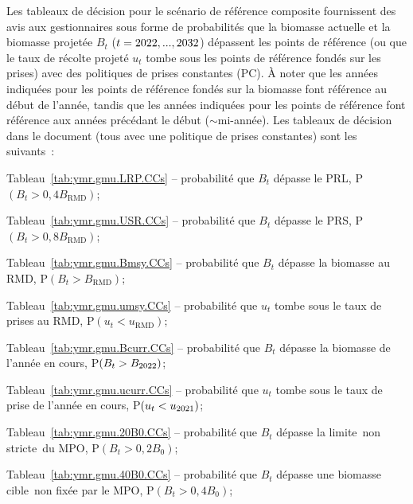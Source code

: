 \documentclass[11pt]{book}
\newcommand{\Bmsy}{B_\text{RMD}}
\newcommand{\umsy}{u_\text{RMD}}
\newcommand{\angL}{\guillemotleft\,}
\newcommand{\angR}{\,\guillemotright}
\begin{document}
Les tableaux de d\'{e}cision pour le sc\'{e}nario de r\'{e}f\'{e}rence composite fournissent des avis aux gestionnaires sous forme de probabilit\'{e}s que la biomasse actuelle et la biomasse projet\'{e}e $B_t$ ($t = 2022, ..., 2032$) d\'{e}passent les points de r\'{e}f\'{e}rence (ou que le taux de r\'{e}colte projet\'{e} $u_t$ tombe sous les points de r\'{e}f\'{e}rence fond\'{e}s sur les prises) avec des politiques de prises constantes (PC). \`{A} noter que les ann\'{e}es indiqu\'{e}es pour les points de r\'{e}f\'{e}rence fond\'{e}s sur la biomasse font r\'{e}f\'{e}rence au d\'{e}but de l'ann\'{e}e, tandis que les ann\'{e}es indiqu\'{e}es pour les points de r\'{e}f\'{e}rence font r\'{e}f\'{e}rence aux ann\'{e}es pr\'{e}c\'{e}dant le d\'{e}but ($\sim$mi-ann\'{e}e).
Les tableaux de d\'{e}cision dans le document (tous avec une politique de prises constantes) sont les suivants~:
\begin{itemize_csas}{}{}
\item Tableau~\ref{tab:ymr.gmu.LRP.CCs} -- probabilit\'{e} que $B_t$ d\'{e}passe le PRL, P$(B_t > 0,4 \Bmsy)$; %
\item Tableau~\ref{tab:ymr.gmu.USR.CCs} -- probabilit\'{e} que $B_t$ d\'{e}passe le PRS, P$(B_t > 0,8 \Bmsy)$; %
\item Tableau~\ref{tab:ymr.gmu.Bmsy.CCs} -- probabilit\'{e} que $B_t$ d\'{e}passe la biomasse au RMD, P$(B_t > \Bmsy)$; %
\item Tableau~\ref{tab:ymr.gmu.umsy.CCs} -- probabilit\'{e} que $u_t$ tombe sous le taux de prises au RMD, P$(u_t < \umsy)$; %
\item Tableau~\ref{tab:ymr.gmu.Bcurr.CCs} -- probabilit\'{e} que $B_t$ d\'{e}passe la biomasse de l'ann\'{e}e en cours, P$(B_t > B_{2022})$; %
\item Tableau~\ref{tab:ymr.gmu.ucurr.CCs} -- probabilit\'{e} que $u_t$ tombe sous le taux de prise de l'ann\'{e}e en cours, P$(u_t < u_{2021})$; %
\item Tableau~\ref{tab:ymr.gmu.20B0.CCs} -- probabilit\'{e} que $B_t$ d\'{e}passe  la limite \angL{}non stricte\angR{} du MPO, P$(B_t > 0,2 B_0)$; %
\item Tableau~\ref{tab:ymr.gmu.40B0.CCs} -- probabilit\'{e} que $B_t$ d\'{e}passe une biomasse \angL{}cible\angR{}  non fix\'{e}e par le MPO, P$(B_t > 0,4 B_0)$; %
\end{itemize_csas}
\end{document}
